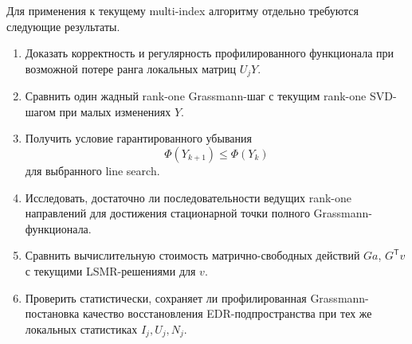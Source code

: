 \documentclass[11pt,a4paper]{article}
\newcommand{\T}{^{\mathsf T}}
\begin{document}
Для применения к текущему multi-index алгоритму отдельно требуются
следующие результаты.

\begin{enumerate}[label=\arabic*.]
    \item Доказать корректность и регулярность профилированного
    функционала при возможной потере ранга локальных матриц
    \(U_jY\).

    \item Сравнить один жадный rank-one Grassmann-шаг с текущим
    rank-one SVD-шагом при малых изменениях \(Y\).

    \item Получить условие гарантированного убывания
    \[
        \Phi(Y_{k+1})\le \Phi(Y_k)
    \]
    для выбранного line search.

    \item Исследовать, достаточно ли последовательности ведущих
    rank-one направлений для достижения стационарной точки полного
    Grassmann-функционала.

    \item Сравнить вычислительную стоимость матрично-свободных действий
    \(Ga\), \(G\T v\) с текущими LSMR-решениями для \(v\).

    \item Проверить статистически, сохраняет ли профилированная
    Grassmann-постановка качество восстановления EDR-подпространства
    при тех же локальных статистиках \(I_j,U_j,N_j\).
\end{enumerate}
\end{document}
